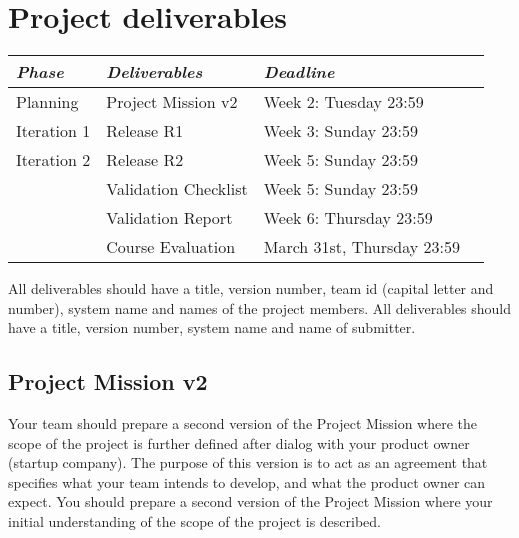 \section{Project deliverables}
\begin{tabular}{l |l p{5cm}  l}
{\it Phase} & {\it Deliverables} & {\it Deadline} \\
\hline
Planning & Project Mission v2& Week 2: Tuesday 23:59\\
Iteration 1 & Release R1 & Week 3: Sunday 23:59 \\
Iteration 2 & Release R2  & Week 5: Sunday 23:59\\
   & Validation Checklist & Week 5: Sunday 23:59\\
   & Validation Report & Week 6: Thursday 23:59\\
\ITERATION3
& Course Evaluation & March 31st, Thursday 23:59  \\

\end{tabular}
\vskip3mm

\ifteknolog
   \noindent All deliverables should have a title, version number, team id (capital letter and number), system name and names of the project members.
\else
   \noindent All deliverables should have a title, version number, system name and name of submitter.
\fi

\subsection{Project Mission v2}
\ifteknolog
   Your team should prepare a second version of the Project Mission where the scope of the project is further defined after dialog with your product owner (startup company). The purpose of this version is to act as an agreement that specifies what your team intends to develop, and what the product owner can expect.
\else
   You should prepare a second version of the Project Mission where your initial understanding of the scope of the project is described. 
\fi

